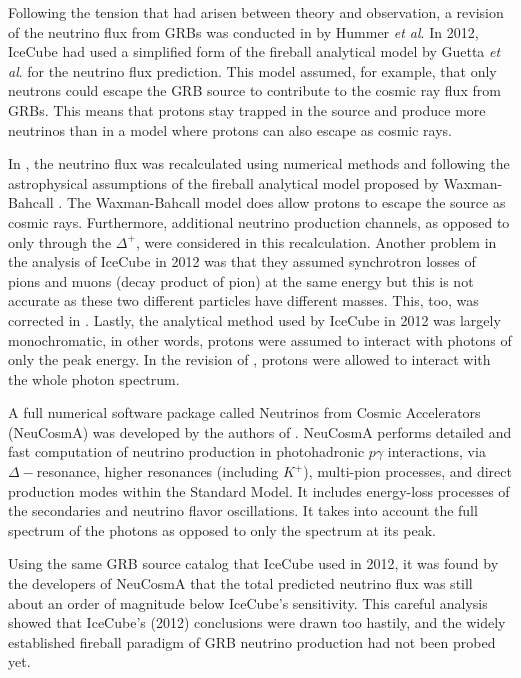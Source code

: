 \documentclass[12pt]{article}
\begin{document}
\begin{doublespace}
Following the tension that had arisen between theory and observation, a revision of the neutrino flux from GRBs was conducted in \cite{Hummer} by Hummer \textit{et al}. In 2012, IceCube had used a simplified form of the fireball analytical model by Guetta \textit{et al}. \cite{guetta} for the neutrino flux prediction. This model assumed, for example, that only neutrons could escape the GRB source to contribute to the cosmic ray flux from GRBs. This means that protons stay trapped in the source and produce more neutrinos than in a model where protons can also escape as cosmic rays.\par
In \cite{Hummer}, the neutrino flux was recalculated using numerical methods and following the astrophysical assumptions of the fireball analytical model proposed by Waxman-Bahcall \cite{firstcalc}. The Waxman-Bahcall model does allow protons to escape the source as cosmic rays. Furthermore, additional neutrino production channels, as opposed to only through the $\Delta^{+}$, were considered in this recalculation. Another problem in the analysis of IceCube in 2012 was that they assumed synchrotron losses of pions and muons (decay product of pion) at the same energy but this is not accurate as these two different particles have different masses. This, too, was corrected in \cite{Hummer}. Lastly, the analytical method used by IceCube in 2012 was largely monochromatic, in other words, protons were assumed to interact with photons of only the peak energy. In the revision of \cite{Hummer}, protons were allowed to interact with the whole photon spectrum.\par
A full numerical software package called Neutrinos from Cosmic Accelerators (NeuCosmA) was developed by the authors of \cite{MBthesis,Hummer}. NeuCosmA performs detailed and fast computation of neutrino production in photohadronic $p \gamma$ interactions, via  $\Delta-$resonance, higher resonances (including $K^+$), multi-pion processes, and direct production modes within the Standard Model. It includes energy-loss processes of the secondaries and neutrino flavor oscillations. It takes into account the full spectrum of the photons as opposed to only the spectrum at its peak.\par
Using the same GRB source catalog that IceCube used in 2012, it was found by the developers of NeuCosmA that the total predicted neutrino flux was still about an order of magnitude below IceCube's sensitivity. This careful analysis showed that IceCube's (2012) conclusions were drawn too hastily, and the widely established fireball paradigm of GRB neutrino production had not been probed yet.
 

\end{doublespace}
\end{document}
